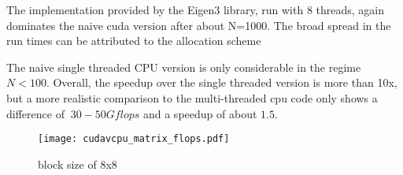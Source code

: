 The implementation provided by the Eigen3 library, run with 8 threads, again dominates the naive cuda version after about N=1000. The broad spread in the run times can be attributed to the allocation scheme 

The naive single threaded CPU version is only considerable in the regime $N<100$. 
Overall, the speedup over the single threaded version is more than 10x, but a more realistic comparison to the multi-threaded cpu code only shows a difference of $~30-50 Gflops$ and a speedup of about $1.5$.

\begin{figure}[h!]
\texttt{[image: cudavcpu\_matrix\_flops.pdf]}
\caption{block size of 8x8}
\end{figure}